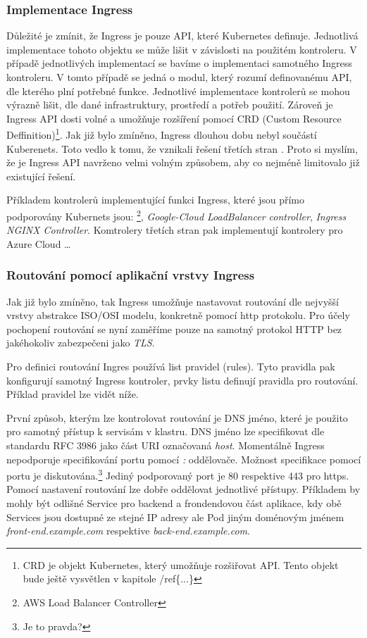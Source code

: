 \subsubsection{Implementace Ingress}
Důležité je zmínit, že Ingress je pouze API, které Kubernetes definuje. Jednotlivá implementace tohoto objektu se může lišit v závislosti na použitém kontroleru. V případě jednotlivých implementací se bavíme o implementaci samotného Ingress kontroleru. V tomto případě se jedná o modul, který rozumí definovanému API, dle kterého plní potřebné funkce. Jednotlivé implementace kontrolerů se mohou výrazně lišit, dle dané infrastruktury, prostředí a potřeb použití. Zároveň je Ingress API dosti volné a umožňuje rozšíření pomocí CRD (Custom Resource Deffinition)\footnote{CRD je objekt Kubernetes, který umožňuje rozšiřovat API. Tento objekt bude ještě vysvětlen v kapitole /ref\{...\}}. Jak již bylo zmíněno, Ingress dlouhou dobu nebyl součástí Kuberenets. Toto vedlo k tomu, že vznikali řešení třetích stran \cite{kashin_2021_gateway}. Proto si myslím, že je Ingress API navrženo velmi volným způsobem, aby co nejméně limitovalo již existující řešení.

Příkladem kontrolerů implementující funkci Ingress, které jsou přímo podporovány Kubernets  jsou: \footnote{AWS Load Balancer Controller}, \textit{Google-Cloud LoadBalancer controller}, \textit{Ingress NGINX Controller}. Komtrolery třetích stran pak implementují kontrolery pro Azure Cloud \ldots

\subsubsection{Routování pomocí aplikační vrstvy Ingress}
Jak již bylo zmíněno, tak Ingress umožňuje nastavovat routování dle nejvyšší vrstvy abstrakce ISO/OSI modelu, konkretně pomocí http protokolu. Pro účely pochopení routování se nyní zaměříme pouze na samotný protokol HTTP bez jakéhokoliv zabezpečeni jako \textit{TLS}.

Pro definici routování Ingres používá list pravidel (rules). Tyto pravidla pak konfigurují samotný Ingress kontroler, prvky listu definují pravidla pro routování. Příklad pravidel lze vidět níže.


První způsob, kterým lze kontrolovat routování je DNS jméno, které je použito pro samotný přístup k servisám v klastru. DNS jméno lze specifikovat dle standardu RFC 3986 jako část URI označovaná \textit{host}. Momentálně Ingress nepodporuje specifikování portu pomocí \textit{:} oddělovače. Možnost specifikace pomocí portu je diskutována.\footnote{Je to pravda?}  Jediný podporovaný port je 80 respektive 443 pro https. Pomocí nastavení routování lze dobře oddělovat jednotlivé přístupy. Příkladem by mohly být odlišné Service pro backend a frondendovou část aplikace, kdy obě Services jsou dostupné ze stejné IP adresy ale Pod jiným doménovým jménem \textit{front-end.example.com} respektive \textit{back-end.example.com}.


